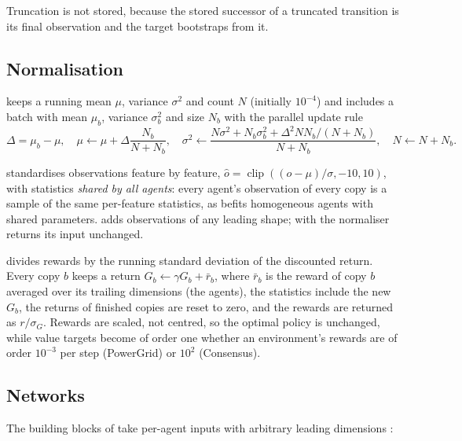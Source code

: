Truncation is not stored, because the stored successor of a truncated
transition is its final observation and the target bootstraps from it.

\subsection{Normalisation}\label{sec:marl-normalisation}

 keeps a running mean $\mu$, variance
$\sigma^2$ and count $N$ (initially $10^{-4}$) and includes a batch with mean
$\mu_b$, variance $\sigma_b^2$ and size $N_b$ with the parallel update rule
\begin{equation}
  \Delta = \mu_b - \mu, \quad
  \mu \leftarrow \mu + \Delta \frac{N_b}{N + N_b}, \quad
  \sigma^2 \leftarrow \frac{N \sigma^2 + N_b \sigma_b^2
      + \Delta^2 N N_b / (N + N_b)}{N + N_b}, \quad
  N \leftarrow N + N_b .
\end{equation}

 standardises
observations feature by feature, $\hat o = \operatorname{clip}((o - \mu) /
\sigma, -10, 10)$, with statistics \emph{shared by all agents}: every agent's
observation of every copy is a sample of the same per-feature statistics, as
befits homogeneous agents with shared parameters.  adds
observations of any leading shape; with  the normaliser
returns its input unchanged.

 divides rewards by the
running standard deviation of the discounted return. Every copy $b$ keeps a
return $G_b \leftarrow \gamma G_b + \bar r_b$, where $\bar r_b$ is the reward of
copy $b$ averaged over its trailing dimensions (the agents), the statistics
include the new $G_b$, the returns of finished copies are reset to zero, and
the rewards are returned as $r / \sigma_G$. Rewards are scaled, not centred, so
the optimal policy is unchanged, while value targets become of order one
whether an environment's rewards are of order $10^{-3}$ per step (PowerGrid)
or $10^{2}$ (Consensus).

\subsection{Networks}\label{sec:marl-networks}

The building blocks of  take per-agent
inputs with arbitrary leading dimensions :

